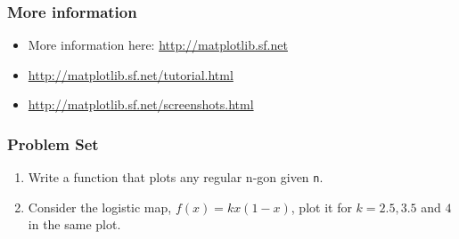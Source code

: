 \documentclass[14pt,compress]{beamer}
\newcounter{time}
\newcommand{\inctime}[1]{\addtocounter{time}{#1}{\tiny \thetime\ m}}
\newcommand{\typ}[1]{\lstinline{#1}}
\begin{document}
\begin{frame}
  \frametitle{More information}
  \begin{itemize}
  \item More information here: \url{http://matplotlib.sf.net}
  \item \url{http://matplotlib.sf.net/tutorial.html}
  \item \url{http://matplotlib.sf.net/screenshots.html}
  \end{itemize}
\inctime{5}
\end{frame}

\begin{frame}
  \frametitle{Problem Set}
  \begin{enumerate}
      \item Write a function that plots any regular n-gon given \typ{n}.
      \item Consider the logistic map, $f(x) = kx(1-x)$, plot it for
          $k=2.5, 3.5$ and $4$ in the same plot.
\end{enumerate}
\end{frame}
\end{document}
